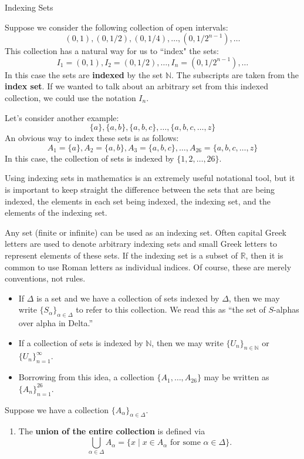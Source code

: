 \begin{section}{Indexing Sets}

Suppose we consider the following collection of open intervals:
\[
(0,1), (0,1/2), (0,1/4), \ldots, (0,1/2^{n-1}), \ldots
\]
This collection has a natural way for us to ``index" the sets:
\[
I_1=(0,1), I_2=(0,1/2), \ldots, I_n=(0,1/2^{n-1}), \ldots
\]
In this case the sets are \textbf{indexed} by the set $\mathbb{N}$.  The subscripts are taken from the \textbf{index set}.  If we wanted to talk about an arbitrary set from this indexed collection, we could use the notation $I_n$.

Let's consider another example:
\[
\{a\}, \{a,b\}, \{a,b,c\}, \ldots, \{a,b,c,\ldots,z\}
\]
An obvious way to index these sets is as follows:
\[
A_1=\{a\}, A_2=\{a,b\}, A_3=\{a,b,c\}, \ldots, A_{26}=\{a,b,c,\ldots,z\}
\]
In this case, the collection of sets is indexed by $\{1,2,\ldots, 26\}$.

Using indexing sets in mathematics is an extremely useful notational tool, but it is important to keep straight the difference between the sets that are being indexed, the elements in each set being indexed, the indexing set, and the elements of the indexing set.

Any set (finite or infinite) can be used as an indexing set. Often capital Greek letters are used to denote arbitrary indexing sets and small Greek letters to represent elements of these sets. If the indexing set is a subset of $\mathbb{R}$, then it is common to use Roman letters as individual indices. Of course, these are merely conventions, not rules.
\begin{itemize}
\item If $\Delta$ is a set and we have a collection of sets indexed by $\Delta$, then we may write $\{S_{\alpha}\}_{\alpha\in \Delta}$ to refer to this collection. We read this as ``the set of $S$-alphas over alpha in Delta.''
\item If a collection of sets is indexed by $\mathbb{N}$, then we may write $\{U_n\}_{n\in\mathbb{N}}$ or $\{U_n\}_{n=1}^{\infty}$.
\item Borrowing from this idea, a collection $\{A_1,\ldots,A_{26}\}$ may be written as $\{A_n\}_{n=1}^{26}$.
\end{itemize}

\begin{definition}
Suppose we have a collection $\{A_{\alpha}\}_{\alpha\in\Delta}$.
\begin{enumerate}[label=\textrm{(\alph*)}]
\item The \textbf{union of the entire collection} is defined via
\[
\boxed{\bigcup_{\alpha\in\Delta} A_{\alpha}=\{x\mid x\in A_{\alpha} \mbox{ for some }\alpha\in \Delta\}.}
\]


\end{enumerate}
\end{definition}
\end{section}

